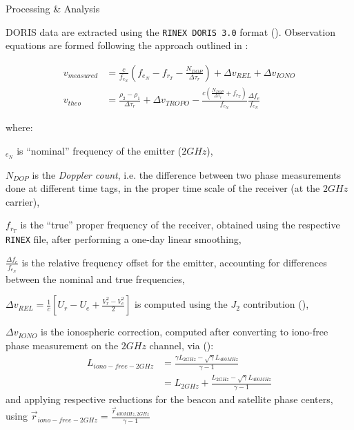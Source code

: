 \documentclass[final,a0,portrait]{beamer}
\newlength{\onecolwid}
\begin{document}
\begin{frame}[t]
\begin{columns}[t]
\begin{column}{\onecolwid}
\begin{block}{Processing \& Analysis}

{\small
DORIS data are extracted using the \texttt{RINEX DORIS 3.0} format 
(\cite{DORISRNX3}). Observation equations are formed following the approach 
outlined in \cite{lemoine-2016}:

\begin{subequations} \label{eq:lem13}
    \begin{align}
        v_{measured} & = \frac{c}{f_{e_N}} (f_{e_N} - f_{r_T} -
          \frac{N_{DOP}}{\Delta\tau_r}) + \Delta v_{REL} + 
          \Delta v_{IONO} \label{eq:lem13a} \\
        v_{theo} &= \frac{\rho_2 - \rho_1}{\Delta\tau_r} +
          \Delta v_{TROPO} - \frac{c(\frac{N_{DOP}}{\Delta\tau_r} + 
          f_{r_T})}{f_{e_N}} \frac{\Delta f_e}{f_{e_N}} \label{eq:lem13b}
    \end{align}
\end{subequations}

where:

\begin{description}
  \item $_{e_N}$ is ``nominal'' frequency of the emitter ($2GHz$),
%
  \item $N_{DOP}$ is the \emph{Doppler count}, i.e. the difference between two 
  phase measurements done at diﬀerent time tags, in the proper time scale of 
  the receiver (at the $2GHz$ carrier),
%
  \item $f_{r_T}$ is the ``true'' proper frequency of the receiver, obtained 
  using the respective \texttt{RINEX} file, after performing a one-day linear 
  smoothing,
%
  \item $\frac{\Delta f_e}{f_{e_N}}$ is the relative frequency offset for the 
  emitter, accounting for differences between the nominal and true frequencies,
%
  \item $\Delta v_{REL} = \frac{1}{c} \left[ U_{r} - U_{e} + \frac{V^2_r - V^2_e}{2} \right]$ is computed using the $J_2$ contribution (\cite{lemoine-2016}),
%
  \item $\Delta v_{IONO}$ is the ionospheric correction, computed after 
  converting to iono-free phase measurement on the $2GHz$ channel, via 
  (\cite{lemoine-2016}):
  \begin{equation}
    \begin{aligned}
      L_{iono-free-2GHz} &= \frac{\gamma L_{2GHz} -
          \sqrt{\gamma}L_{400MHz}}{\gamma - 1} \\
                     &= L_{2GHz} + \frac{L_{2GHz} -
                        \sqrt{\gamma}L_{400MHz}}{\gamma - 1}
    \end{aligned}
  \end{equation}
  and applying respective reductions for the beacon and satellite phase centers, 
  using $\vec{r}_{iono-free-2GHz} = \frac{\vec{r}_{400MHz,2GHz}}{\gamma - 1}$


\end{description}}
\end{block}
\end{column}
\end{columns}
\end{frame}
\end{document}
